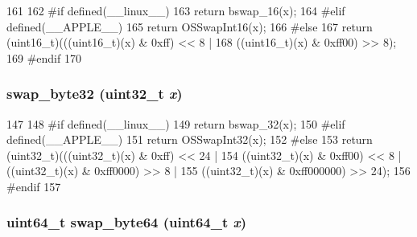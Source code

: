 \begin{DoxyCode}
161 {
162 #if defined(__linux__)
163     return bswap_16(x);
164 #elif defined(__APPLE__)
165     return OSSwapInt16(x);
166 #else
167     return (uint16_t)(((uint16_t)(x) & 0xff) << 8 |
168                       ((uint16_t)(x) & 0xff00) >> 8);
169 #endif
170 }
\end{DoxyCode}
\hypertarget{byteswap_8hh_a22bec80aff1a93b99ca7974b6b72810d}{
\subsubsection[{swap\_\-byte32}]{ swap\_\-byte32 ({\bf uint32\_\-t} {\em x})}}
\label{byteswap_8hh_a22bec80aff1a93b99ca7974b6b72810d}



\begin{DoxyCode}
147 {
148 #if defined(__linux__)
149     return bswap_32(x);
150 #elif defined(__APPLE__)
151     return OSSwapInt32(x);
152 #else
153     return  (uint32_t)(((uint32_t)(x) & 0xff) << 24 |
154             ((uint32_t)(x) & 0xff00) << 8 | ((uint32_t)(x) & 0xff0000) >> 8 |
155             ((uint32_t)(x) & 0xff000000) >> 24);
156 #endif
157 }
\end{DoxyCode}
\hypertarget{byteswap_8hh_a967a7b2fbf5389735a64a247a9122822}{
\subsubsection[{swap\_\-byte64}]{\setlength{\rightskip}{0pt plus 5cm}uint64\_\-t swap\_\-byte64 (uint64\_\-t {\em x})}}
\label{byteswap_8hh_a967a7b2fbf5389735a64a247a9122822}



